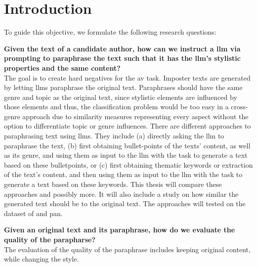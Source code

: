 \chapter{Introduction}
\label{chap:introduction}





To guide this objective, we formulate the following research questions:
\begin{questions}
    \item \textbf{Given the text of a candidate author, how can we instruct a \ac{llm} via prompting to paraphrase the text such that it has the \ac{llm}'s stylistic properties and the same content?} \label{enum:rq1} \hfill \\
    The goal is to create hard negatives for the \ac{av} task.
    Imposter texts are generated by letting \acp{llm} paraphrase the original text.
    Paraphrases should have the same genre and topic as the original text, 
    since stylistic elements are influenced by those elements and thus, 
    the classification problem would be too easy in a cross-genre approach 
    due to similarity measures representing every aspect without the option to differentiate topic or genre influences.
    There are different approaches to paraphrasing text using \acp{llm}.
    They include (a) directly asking the \ac{llm} to paraphrase the text, 
    (b) first obtaining bullet-points of the texts' content, as well as its genre, and using them as input to the \ac{llm} with the task to generate a text based on these bulletpoints, 
    or (c) first obtaining thematic keywords or extraction of the text's content, and then using them as input to the \ac{llm} with the task to generate a text based on these keywords.
    This thesis will compare these approaches and possibly more.
    It will also include a study on how similar the generated text should be to the original text.
    The approaches will tested on the dataset of \citet{koppel_determining_2014} and \ac{pan}.

    \item \textbf{Given an original text and its paraphrase, how do we evaluate the quality of the parapharse?} \label{enum:rq2} \hfill \\
    The evaluation of the quality of the paraphrase includes keeping original content, while changing the style.


\end{questions}
